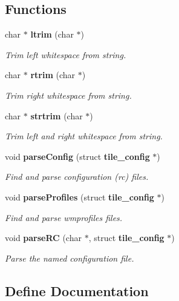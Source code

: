 \subsection*{Functions}
\begin{CompactItemize}
\item 
char $\ast$ {\bf ltrim} (char $\ast$)
\begin{CompactList}\small\item\em Trim left whitespace from string. \item\end{CompactList}\item 
char $\ast$ {\bf rtrim} (char $\ast$)
\begin{CompactList}\small\item\em Trim right whitespace from string. \item\end{CompactList}\item 
char $\ast$ {\bf strtrim} (char $\ast$)
\begin{CompactList}\small\item\em Trim left and right whitespace from string. \item\end{CompactList}\item 
void {\bf parse\-Config} (struct {\bf tile\_\-config} $\ast$)
\begin{CompactList}\small\item\em Find and parse configuration (rc) files. \item\end{CompactList}\item 
void {\bf parse\-Profiles} (struct {\bf tile\_\-config} $\ast$)
\begin{CompactList}\small\item\em Find and parse wmprofiles files. \item\end{CompactList}\item 
void {\bf parse\-RC} (char $\ast$, struct {\bf tile\_\-config} $\ast$)
\begin{CompactList}\small\item\em Parse the named configuration file. \item\end{CompactList}\end{CompactItemize}


\subsection{Define Documentation}

